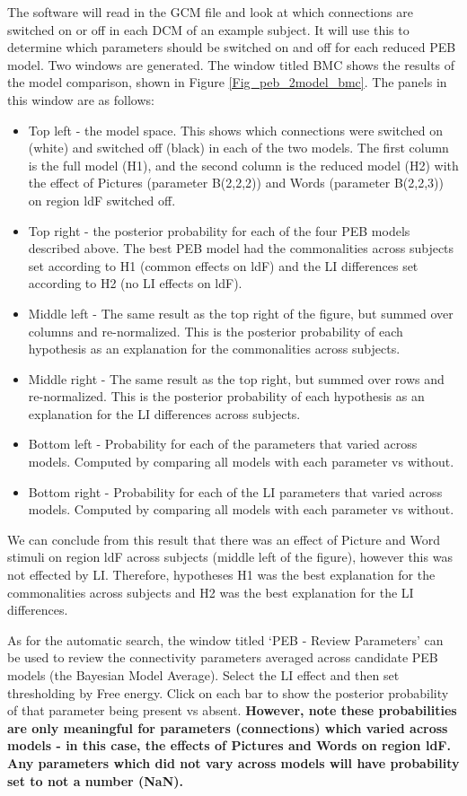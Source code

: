 \documentclass{article}
\begin{document}
The software will read in the GCM file and look at which connections are switched on or off in each DCM of an example subject. It will use this to determine which parameters should be switched on and off for each reduced PEB model. Two windows are generated. The window titled BMC shows the results of the model comparison, shown in Figure \ref{Fig_peb_2model_bmc}. The panels in this window are as follows:
\begin{itemize}
    \item Top left - the model space. This shows which connections were switched on (white) and switched off (black) in each of the two models. The first column is the full model (H1), and the second column is the reduced model (H2) with the effect of Pictures (parameter B(2,2,2)) and Words (parameter B(2,2,3)) on region ldF switched off.
    \item Top right - the posterior probability for each of the four PEB models described above. The best PEB model had the commonalities across subjects set according to H1 (common effects on ldF) and the LI differences set according to H2 (no LI effects on ldF).
    \item Middle left - The same result as the top right of the figure, but summed over columns and re-normalized. This is the posterior probability of each  hypothesis as an explanation for the commonalities across subjects.
    \item Middle right - The same result as the top right, but summed over rows and re-normalized. This is the posterior probability of each  hypothesis as an explanation for the LI differences across subjects.
    \item Bottom left - Probability for each of the parameters that varied across models. Computed by comparing all models with each parameter vs without.
    \item Bottom right - Probability for each of the LI parameters that varied across models. Computed by comparing all models with each parameter vs without.
\end{itemize}

We can conclude from this result that there was an effect of Picture and Word stimuli on region ldF across subjects (middle left of the figure), however this was not effected by LI. Therefore, hypotheses H1 was the best explanation for the commonalities across subjects and H2 was the best explanation for the LI differences.

As for the automatic search, the window titled `PEB - Review Parameters' can be used to review the connectivity parameters averaged across candidate PEB models (the Bayesian Model Average). Select the LI effect and then set thresholding by Free energy. Click on each bar to show the posterior probability of that parameter being present vs absent. \textbf{However, note these probabilities are only meaningful for parameters (connections) which varied across models - in this case, the effects of Pictures and Words on region ldF. Any parameters which did not vary across models will have probability set to not a number (NaN).} 
\end{document}

